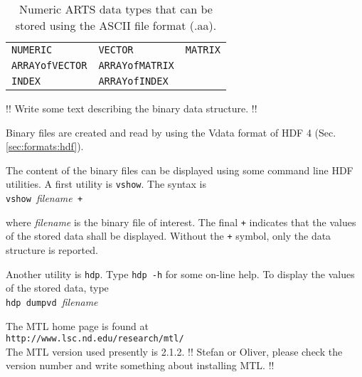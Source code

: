  

 \begin{table}[t]
  \begin{tabular}{p{4.5cm} p{4.5cm} p{4.5cm}}
   \verb|NUMERIC|        & \verb|VECTOR|         & \verb|MATRIX|          \\
   \verb|ARRAYofVECTOR|  & \verb|ARRAYofMATRIX|  &                        \\
   \verb|INDEX|          & \verb|ARRAYofINDEX|  &                        \\
  \end{tabular}
  \caption{Numeric ARTS data types that can be stored using the ASCII
           file format (.aa).}
  \label{table:format:aa}
 \end{table}
 

 \label{sec:formats:file:binary}
  
 !! Write some text describing the binary data structure. !!

 Binary files are created and read by using the Vdata format of HDF 4 (Sec.
 \ref{sec:formats:hdf}). 

 The content of the binary files can be displayed using some command line
 HDF utilities. A first utility is \verb|vshow|. The syntax is \\

 \verb|vshow |{\it filename}\verb| +|

 \noindent
 where {\it filename} is the binary file of interest. The final \verb|+|
 indicates that the values of the stored data shall be displayed. Without
 the \verb|+| symbol, only the data structure is reported.

 Another utility is \verb|hdp|. Type \verb|hdp -h| for some on-line help.
 To display the values of the stored data, type\\
 
 \verb|hdp dumpvd |{\it filename}



 \label{sec:formats:mtl}

 The MTL home page is found at \\

 \verb|http://www.lsc.nd.edu/research/mtl/| \\

 \noindent
 The MTL version used presently is 2.1.2. !! Stefan or Oliver, please check
 the version number and write something about installing MTL. !!


 \label{sec:formats:hdf}

